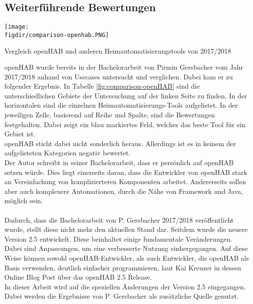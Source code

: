 \subsection{Weiterführende Bewertungen}
\begin{minipage}{\textwidth}
	\centering
	\captionsetup{type=figure}
	\texttt{[image: \\figdir/comparison-openhab.PNG]}
	\caption{Vergleich openHAB und anderen Heimautomatisierungstools von 2017/2018 \label{fig:comparison-openHAB}}
\end{minipage}
\smallskip
openHAB wurde bereits in der Bachelorarbeit von Pirmin Gersbacher vom Jahr 2017/2018 anhand von Usecases untersucht und verglichen. Dabei kam er zu folgender Ergebnis.
In Tabelle \ref{fig:comparison-openHAB} sind die unterschiedlichen Gebiete der Untersuchung auf der linken Seite zu finden. In der horizontalen sind die einzelnen Heimautomatisierungs-Tools aufgelistet. In der jeweiligen Zelle, basierend auf Reihe und Spalte, sind die Bewertungen festgehalten. Dabei zeigt ein blau markiertes Feld, welches das beste Tool für ein Gebiet ist.\\
openHAB sticht dabei nicht sonderlich heraus. Allerdings ist es in keinem der aufgelisteten Kategorien negativ bewertet.\\
Der Autor schreibt in seiner Bachelorarbeit, dass er persönlich auf openHAB setzen würde. Dies liegt einerseits daran, dass die Entwickler von openHAB stark an Vereinfachung von komplizierteren Komponenten arbeitet. Andererseits sollen aber auch komplexere Automationen, durch die Nähe von Framework und Java, möglich sein.\cite{BA01:OPH}
\\
\\
Dadurch, dass die Bachelorarbeit von P. Gersbacher 2017/2018 veröffentlicht wurde, stellt diese nicht mehr den aktuellen Stand dar. Seitdem wurde die neuere Version 2.5 entwickelt. Diese beinhaltet einige fundamentale Veränderungen. Dabei sind Anpassungen, um eine verbesserte Nutzung einhergegangen. Auf diese Weise können sowohl openHAB-Entwickler, als auch Entwickler, die openHAB als Basis verwenden, deutlich einfacher programmieren, laut Kai Kreuzer in dessen Online Blog Post über das openHAB 2.5 Release.\cite{openHAB02:OH}\\
In dieser Arbeit wird auf die speziellen Änderungen der Version 2.5 eingegangen. Dabei werden die Ergebnisse von P. Gersbacher als zusätzliche Quelle genutzt.


